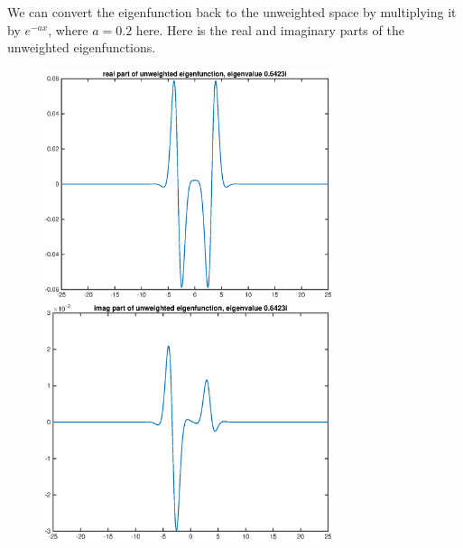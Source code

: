 \documentclass[12pt]{article}
\begin{document}
We can convert the eigenfunction back to the unweighted space by multiplying it by $e^{-ax}$, where $a = 0.2$ here. Here is the real and imaginary parts of the unweighted eigenfunctions.
\begin{figure}[H]
\includegraphics[width=8.5cm]{1double2eigenfnrealunweighted}
\includegraphics[width=8.5cm]{1double2eigenfnimagunweighted}
\end{figure}
\end{document}
